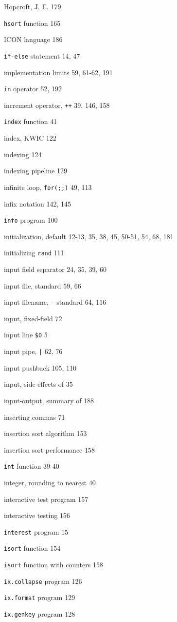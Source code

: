 \begin{multicols}{2}
Hopcroft, J. E. 179

\verb'hsort' function 165

ICON language 186

\verb'if-else' statement 14, 47

implementation limits 59, 61-62, 191

\verb'in' operator 52, 192

increment operator, \verb'++' 39, 146, 158

\verb'index' function 41

index, KWIC 122

indexing 124

indexing pipeline 129

infinite loop, \verb'for(;;)' 49, 113

infix notation 142, 145

\verb'info' program 100

initialization, default 12-13, 35, 38, 45, 50-51, 54, 68, 181

initializing \verb'rand' 111

input field separator 24, 35, 39, 60

input file, standard 59, 66

input filename, \verb'-' standard 64, 116

input, fixed-field 72

input line \verb'$0' 5

input pipe, \verb'|' 62, 76

input pushback 105, 110

input, side-effects of 35

input-output, summary of 188

inserting commas 71

insertion sort algorithm 153

insertion sort performance 158

\verb'int' function 39-40

integer, rounding to nearest 40

interactive test program 157

interactive testing 156

\verb'interest' program 15 

\verb'isort' function 154

\verb'isort' function with counters 158

\verb'ix.collapse' program 126

\verb'ix.format' program 129 

\verb'ix.genkey' program 128 


\end{multicols}
